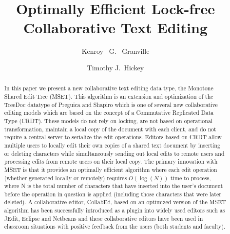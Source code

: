 \documentclass{amsart}
\title{Optimally Efficient Lock-free Collaborative Text Editing}
\author{
Kenroy~ G.~ Granville
\and 
Timothy J.~Hickey 
}
\begin{document}
\maketitle

\begin{abstract}
In this paper we present a new collaborative text editing data type,  
the Monotone Shared Edit Tree (MSET). This algorithm is an extension
and optimization of the TreeDoc datatype of Preguica and Shapiro 
which is one of several new collaborative editing models which are based
on the concept of a Commutative Replicated Data Type (CRDT). 
These models do not rely on locking, are not based on operational transformation,
maintain a local copy of the document with each client,  
and do not require a central server to serialize the edit operations.
Editors based on CRDT allow multiple users to locally 
edit their own copies  of a shared text document
by inserting or deleting characters
while simultaneously sending out local edits 
to remote users and processing edits from remote users 
on their local copy. The primary innovation with MSET is that it
provides an optimally efficient algorithm where 
each edit operation (whether generated locally or remotely) 
requires $O(\log(N))$ time to process, where
N is the total number of characters that have inserted 
into the user's document before the operation in
question is applied (including those characters that were later deleted).
A collaborative editor, CollabEd, 
based on an optimized version of the MSET algorithm 
has been successfully introduced as a plugin into widely used
editors such as JEdit, Eclipse and Netbeans and 
these collaborative editors have been used in classroom situations
with positive feedback from the users (both students and faculty).
\end{abstract}
\newpage
\tableofcontents
\newpage
\end{document}
